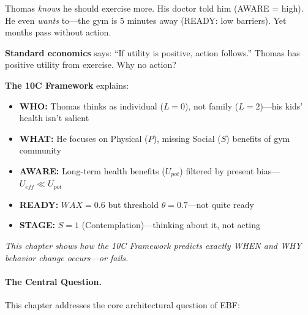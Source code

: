 \begin{tcolorbox}[colback=gray!5!white, colframe=gray!75!black,
    title=\textbf{Why This Matters: Thomas's Fitness Journey}]
\small
Thomas \emph{knows} he should exercise more. His doctor told him (AWARE = high). He even \emph{wants} to---the gym is 5 minutes away (READY: low barriers). Yet months pass without action.

\textbf{Standard economics} says: ``If utility is positive, action follows.'' Thomas has positive utility from exercise. Why no action?

\textbf{The 10C Framework} explains:
\begin{itemize}[nosep]
    \item \textbf{WHO:} Thomas thinks as individual ($L=0$), not family ($L=2$)---his kids' health isn't salient
    \item \textbf{WHAT:} He focuses on Physical ($P$), missing Social ($S$) benefits of gym community
    \item \textbf{AWARE:} Long-term health benefits ($U_{pot}$) filtered by present bias---$U_{eff} \ll U_{pot}$
    \item \textbf{READY:} $WAX = 0.6$ but threshold $\theta = 0.7$---not quite ready
    \item \textbf{STAGE:} $S = 1$ (Contemplation)---thinking about it, not acting
\end{itemize}

\textit{This chapter shows how the 10C Framework predicts exactly WHEN and WHY behavior change occurs---or fails.}
\end{tcolorbox}

\paragraph{The Central Question.}
This chapter addresses the core architectural question of EBF:

\begin{center}
\end{center}

